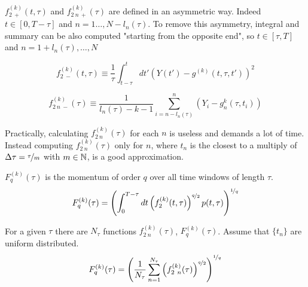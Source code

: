 \begin{step}
$f_{2 \ +}^{( k )}( t, \tau )$ and $f_{2\ n \ +}^{( k )}( \tau )$ are defined in an asymmetric way. Indeed $t \in [0, T-\tau]$ and $n = 1 \dots, N - l_n(\tau)$. 
To remove this asymmetry, integral and summary can be also computed "starting from the opposite end", so $t \in [\tau, T]$ and $n = 1 + l_n(\tau), \dots, N$

\begin{equation*}
	f_{2 \ -}^{( k )}( t, \tau ) \equiv \frac{1}{\tau} \int_{t-\tau}^{t} dt' \left( Y( t' ) - g^{( k )}(t, \tau, t')  \right)^2
\end{equation*}

\begin{equation*}
	f_{2\ n \ -}^{( k )}( \tau ) \equiv \frac{1}{l_n(\tau) - k - 1} \sum_{i=n - l_n(\tau)}^{n} \left(Y_i - g_n^{k} (\tau, t_i) \right)
\end{equation*}

Practically, calculating $f_{2\ n}^{( k )}( \tau )$ for each $n$ is useless and demands a lot of time.  Instead computing $f_{2\ n}^{( k )}( \tau )$ only for $n$, where $t_n$ is the closest to a multiply of $\Delta \tau = \nicefrac{\tau}{m}$ with $m \in \mathbb{N}$, is a good approximation.
\end{step}

\begin{step}\label{step4}
$F_q^{( k )}(\tau )$ is the momentum of order $q$ over all time windows of length $\tau$.
\begin{equation*}
	F_q^{( k )} ( \tau ) =  \left(\int_0^{T-\tau} dt \left( f_2^{( k )}( t, \tau ) \right)^{\nicefrac{q}{2}} p(t, \tau)  \right)^{\nicefrac{1}{q}}
\end{equation*}

For a given $\tau$ there are $N_\tau$ functions $f_{2\ n}^{( k )}( \tau )$, $F_q^{( k )} ( \tau )$. Assume that $\{t_n\}$ are uniform distributed.
\begin{equation*}
	F_q^{( k )} ( \tau ) = \left( \frac{1}{N_\tau} \sum_{n=1}^{N_\tau} \left( f_{2\ n}^{( k )}( \tau ) \right)^{\nicefrac{q}{2}} \right)^{\nicefrac{1}{q}}
\end{equation*}
\end{step}

